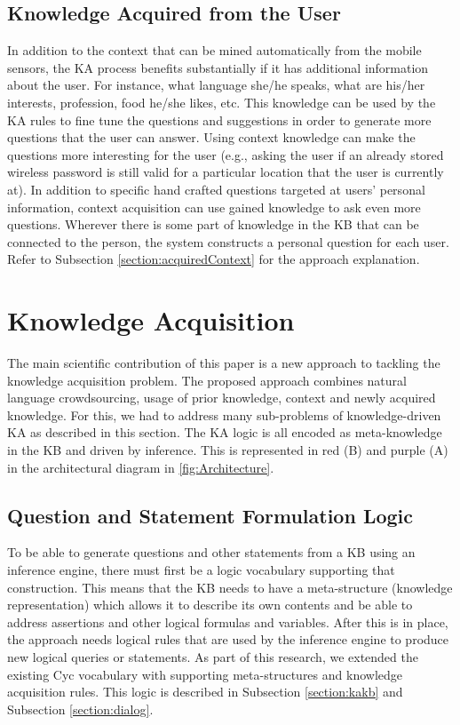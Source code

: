 \subsection{Knowledge Acquired from the User}
\label{section:bg:contextm}
In addition to the context that can be mined automatically from the mobile 
sensors, the KA process benefits substantially if it has additional information
about the user. For instance, what language she/he speaks, what are his/her 
interests, profession, food he/she likes, etc. This knowledge can be used by 
the KA rules to fine tune the questions and suggestions in order to generate 
more questions that the user can answer. Using context knowledge can make 
the questions more interesting for the user (e.g., asking the user if an 
already stored wireless password is still valid for a particular location that 
the user is currently at). In addition to specific hand crafted questions 
targeted at users' personal information, context acquisition can use gained 
knowledge to ask even more questions. Wherever there is some part of knowledge 
in the KB that can be connected to the person, the system constructs a 
personal question for each user. Refer to Subsection \ref{section:acquiredContext} for
the approach explanation.

\section{Knowledge Acquisition}
\label{section:bg:ka}
The main scientific contribution of this paper is a new approach to tackling 
the knowledge acquisition problem. The proposed approach combines natural 
language crowdsourcing, usage of prior knowledge, context and newly acquired 
knowledge. For this, we had to address many sub-problems of knowledge-driven 
KA as described in this section. The KA logic is all encoded as meta-knowledge 
in the KB and driven by inference. This is represented in red (B) and purple 
(A) in the architectural diagram in \autoref{fig:Architecture}.

\subsection{Question and Statement Formulation Logic} 
To be able to generate questions and other statements from a KB using an 
inference engine, there must first be a logic vocabulary supporting that 
construction. This means that the KB needs to have a meta-structure 
(knowledge representation) which allows it to describe its own contents and be
able to address assertions and other logical formulas and variables. After this
is in place, the approach needs logical rules that are used by the inference
engine to produce new logical queries or statements. As part of this research, 
we extended the existing Cyc vocabulary with supporting meta-structures and 
knowledge acquisition rules. This logic is described in Subsection \ref{section:kakb} and Subsection \ref{section:dialog}.

